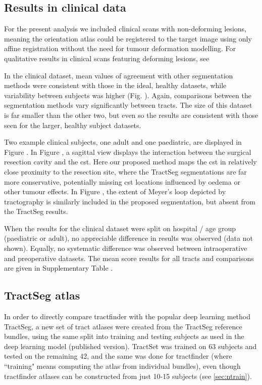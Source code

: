 \subsection{Results in clinical data}

For the present analysis we included clinical scans with non-deforming lesions, meaning the orientation atlas could be registered to the target image using only affine registration without the need for tumour deformation modelling.
For qualitative results in clinical scans featuring deforming lesions, see \textcite{Young2022}

In the clinical dataset, mean values of agreement with other segmentation methods were consistent with those in the ideal, healthy datasets, while variability between subjects was higher (Fig. ).
Again, comparisons between the segmentation methods vary significantly between tracts.
The size of this dataset is far smaller than the other two, but even so the results are consistent with those seen for the larger, healthy subject datasets.

Two example clinical subjects, one adult and one paediatric, are displayed in Figure .
In Figure , a sagittal view displays the interaction between the surgical resection cavity and the \gls{cst}.
Here our proposed method maps the \gls{cst} in relatively close proximity to the resection site, where the TractSeg segmentations are far more conservative, potentially missing \gls{cst} locations influenced by oedema or other tumour effects.
In Figure , the extent of Meyer's loop depicted by tractography is similarly included in the proposed segmentation, but absent from the TractSeg results.

When the results for the clinical dataset were split on hospital / age group (paediatric or adult), no appreciable difference in results was observed (data not shown).
Equally, no systematic difference was observed between intraoperative and preoperative datasets.
The mean score results for all tracts and comparisons are given in Supplementary Table .


\subsection{TractSeg atlas}


In order to directly compare tractfinder with the popular deep learning method TractSeg, a new set of tract atlases were created from the TractSeg reference bundles, using the same split into training and testing subjects as used in the deep learning model (published version).
TractSet was trained on 63 subjects and tested on the remaining 42, and the same was done for tractfinder (where ``training" means computing the atlas from individual bundles), even though tractfinder atlases can be constructed from just 10-15 subjects (see \ref{sec:ntrain}).

